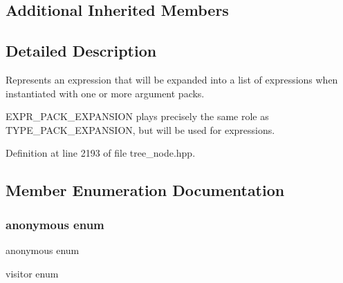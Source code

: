 \subsection*{Additional Inherited Members}


\subsection{Detailed Description}
Represents an expression that will be expanded into a list of expressions when instantiated with one or more argument packs. 

E\+X\+P\+R\+\_\+\+P\+A\+C\+K\+\_\+\+E\+X\+P\+A\+N\+S\+I\+ON plays precisely the same role as T\+Y\+P\+E\+\_\+\+P\+A\+C\+K\+\_\+\+E\+X\+P\+A\+N\+S\+I\+ON, but will be used for expressions. 

Definition at line 2193 of file tree\+\_\+node.\+hpp.



\subsection{Member Enumeration Documentation}
\mbox{\label{structexpr__pack__expansion_ad1bd43f8d3ce5c891879040cd92fd4ee}} 
\subsubsection{\texorpdfstring{anonymous enum}{anonymous enum}}
{\footnotesize\ttfamily anonymous enum}



visitor enum 

